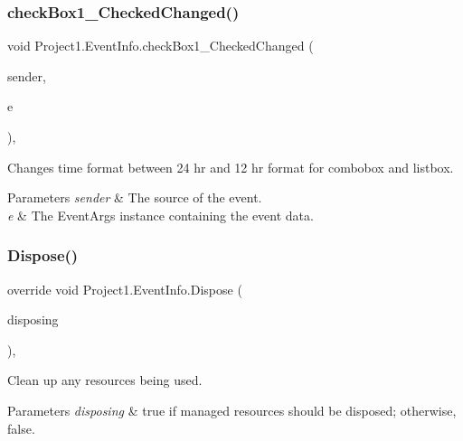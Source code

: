 \subsubsection{\texorpdfstring{check\+Box1\+\_\+\+Checked\+Changed()}{checkBox1\_CheckedChanged()}}
{\footnotesize\ttfamily void Project1.\+Event\+Info.\+check\+Box1\+\_\+\+Checked\+Changed (\begin{DoxyParamCaption}\item[{object}]{sender,  }\item[{Event\+Args}]{e }\end{DoxyParamCaption})\hspace{0.3cm}{\ttfamily [inline]}, {\ttfamily [private]}}



Changes time format between 24 hr and 12 hr format for combobox and listbox. 


\begin{DoxyParams}{Parameters}
{\em sender} & The source of the event.\\
\hline
{\em e} & The Event\+Args instance containing the event data.\\
\hline
\end{DoxyParams}
\mbox{\label{classProject1_1_1EventInfo_aa54f1ee810e1b9ea20b3bb9ed76be80b}} 
\subsubsection{\texorpdfstring{Dispose()}{Dispose()}}
{\footnotesize\ttfamily override void Project1.\+Event\+Info.\+Dispose (\begin{DoxyParamCaption}\item[{bool}]{disposing }\end{DoxyParamCaption})\hspace{0.3cm}{\ttfamily [inline]}, {\ttfamily [protected]}}



Clean up any resources being used. 


\begin{DoxyParams}{Parameters}
{\em disposing} & true if managed resources should be disposed; otherwise, false.\\
\hline
\end{DoxyParams}
\mbox{\label{classProject1_1_1EventInfo_a3bf5e88c899ab15fbe76bdccc1a72e9d}} 
